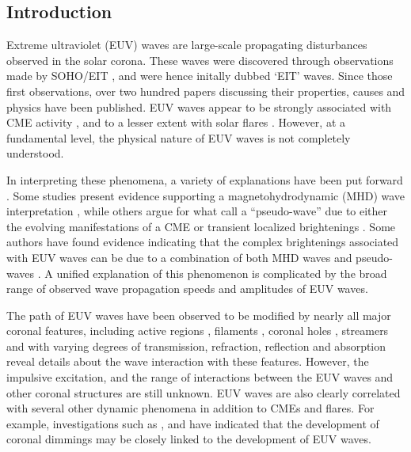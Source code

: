 \documentclass[referee,a4paper,12pt,traditabstract]{swsc}
\begin{document}
\begin{linenumbers}
\maketitle

\section{Introduction}\label{sec:Intro}

Extreme ultraviolet (EUV) waves are large-scale propagating
disturbances observed in the solar corona. These waves were discovered
through observations made by SOHO/EIT \citep{1997SoPh..175..571M,
  1998GeoRL..25.2465T, 1999ApJ...517L.151T}, and were hence initally
dubbed `EIT' waves. Since those first observations, over two hundred
papers discussing their properties, causes and physics have been
published. EUV waves appear to be strongly associated with CME
activity \cite{2002ApJ...569.1009B}, and to a lesser extent with solar
flares \citep{2006ApJ...641L.153}. However, at a fundamental level,
the physical nature of EUV waves is not completely understood.

In interpreting these phenomena, a variety of explanations have been
put forward \citep[see][for a review of current interpretations of EUV
waves]{2011SSRv..158..365G}. Some studies present evidence supporting
a magnetohydrodynamic (MHD) wave interpretation
\citep{1998GeoRL..25.2465T, 1999ApJ...517L.151T,2000ApJ...543L..89W,
  2001JGR...10625089W, 2002ApJ...574..440O, 2010ApJ...713.1008S},
while others argue for what \cite{2012SoPh..281..187P} call a
“pseudo-wave” due to either the evolving manifestations of a CME
\citep{1999SoPh..190..107D, 2000ApJ...545..512D, 2008SoPh..247..123D,
  2011ApJ...738..167S} or transient localized brightenings
\citep{2007ApJ...656L.101A, 2007AN....328..760A}.  Some authors have
found evidence indicating that the complex brightenings associated
with EUV waves can be due to a combination of both MHD waves and
pseudo-waves \citep{2002ApJ...572L..99C, 2005ApJ...622.1202C,
  2004A&A...427..705Z, 2009ApJ...705..587C}. A unified explanation of
this phenomenon is complicated by the broad range of observed wave
propagation speeds \citep{2011A&A...532A.151W} and amplitudes of EUV
waves.

The path of EUV waves have been observed to be modified by nearly all
major coronal features, including active regions
\citep{2000ApJ...543L..89W}, filaments \citep{2012ApJ...753...52L},
coronal holes \citep{2009ApJ...691L.123G}, streamers
\citep{2013ApJ...766...55K} and with varying degrees of transmission,
refraction, reflection and absorption reveal details about the wave
interaction with these features. However, the impulsive excitation,
and the range of interactions between the EUV waves and other coronal
structures are still unknown. EUV waves are also clearly correlated
with several other dynamic phenomena in addition to CMEs and
flares. For example, investigations such as
\cite{2000SoPh..193..161T}, \cite{2004A&A...427..705Z} and
\cite{2010ApJ...709..369P} have indicated that the development of
coronal dimmings may be closely linked to the development of EUV
waves.


\end{linenumbers}
\end{document}
